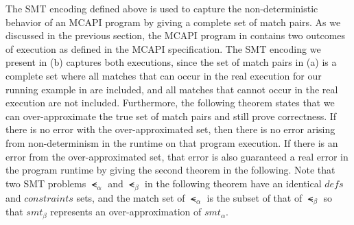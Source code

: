 The SMT encoding defined above is used to capture the non-deterministic behavior of an MCAPI program by giving a complete set of match pairs. As we discussed in the previous section, the MCAPI program in  contains two outcomes of execution as defined in the MCAPI specification. The SMT encoding we present in (b) captures both executions, since the set of match pairs in (a) is a complete set where all matches that can occur in the real execution for our running example in  are included, and all matches that cannot occur in the real execution are not included. Furthermore, the following theorem states that we can over-approximate the true set of match pairs and still prove correctness. If there is no error with the over-approximated set, then there is no error arising from non-determinism in the runtime on that program execution. If there is an error from the over-approximated set, that error is also guaranteed a real error in the program runtime by giving the second theorem in the following. Note that two SMT problems $\smt_{\alpha}$ and $\smt_{\beta}$ in the following theorem have an identical $\mathit{defs}$ and $\mathit{constraints}$ sets, and the match set of $\smt_{\alpha}$ is the subset of that of $\smt_{\beta}$ so that $smt_{\beta}$ represents an over-approximation of $smt_{\alpha}$.

